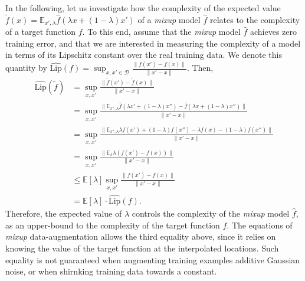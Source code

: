 \documentclass{article}
\begin{document}
In the following, let us investigate how the complexity of the expected value
$\tilde{f}(x) = \mathbb{E}_{x', \lambda} \hat{f}(\lambda x + (1 - \lambda) x')$
of a \emph{mixup} model $\hat{f}$ relates to the complexity of a target
function $f$. To this end, assume that the \emph{mixup} model $\hat{f}$
achieves zero training error, and that we are interested in measuring the
complexity of a model in terms of its Lipschitz constant over the real training
data. We denote this quantity by $\hat{\text{Lip}}(f) = \sup_{x, x' \in
\mathcal{D}} \frac{\| f(x') - f(x) \|}{\| x' - x \|}$. Then,
\begin{align*}
  \hat{\text{Lip}}(\tilde{f}) &= \sup_{x, x'} \frac{\| \tilde{f}(x') - \tilde{f}(x)
                        \|}{\| x' - x \|}\\
                        &= \sup_{x, x'} \frac{\| \mathbb{E}_{x'', \lambda}
                        \hat{f}(\lambda x' + (1-\lambda) x'') - \hat{f}(\lambda
                        x + (1-\lambda) x'')\|}{\| x' - x \|}\\
                        &= \sup_{x, x'} \frac{\| \mathbb{E}_{x'', \lambda}
                        \lambda {f}(x') + (1-\lambda)f(x'') - \lambda f(x) -
                        (1-\lambda) f(x'')\|}{\| x' - x \|}\\
                        &= \sup_{x, x'} \frac{\| \mathbb{E}_{\lambda} \lambda
                        ({f}(x') - f(x))\|}{\| x' - x \|}\\
                        &\leq \mathbb{E}[\lambda] \sup_{x, x'} \frac{\| {f}(x')
                        - f(x)\|}{\| x' - x \|}\\
                        &= \mathbb{E}[\lambda] \cdot \hat{\text{Lip}}(f).
\end{align*}
Therefore, the expected value of $\lambda$ controls the complexity of the
\emph{mixup} model $\hat{f}$, as an upper-bound to the complexity of the target
function $f$.  The equations of \emph{mixup} data-augmentation allows the third
equality above, since it relies on knowing the value of the target function at
the interpolated locations. Such equality is not guaranteed when augmenting
training examples additive Gaussian noise, or when shirnking training data
towards a constant.
\end{document}
